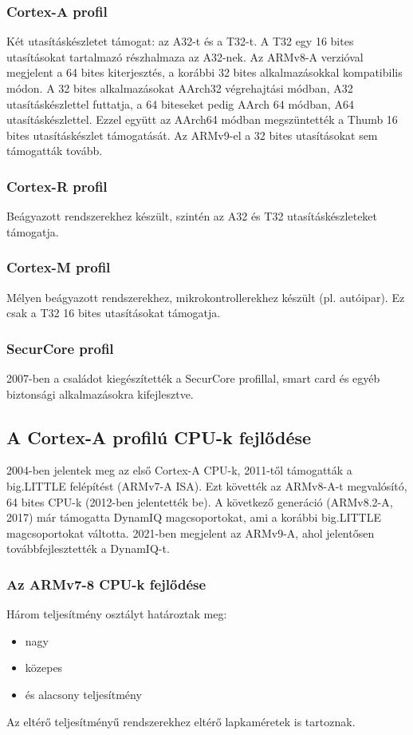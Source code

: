 \subsubsection{Cortex-A profil}
Két utasításkészletet támogat: az A32-t és a T32-t.
A T32 egy 16 bites utasításokat tartalmazó részhalmaza az A32-nek.
Az ARMv8-A verzióval megjelent a 64 bites kiterjesztés, a korábbi 32 bites alkalmazásokkal kompatibilis módon.
A 32 bites alkalmazásokat AArch32 végrehajtási módban, A32 utasításkészlettel futtatja, a 64 biteseket pedig AArch 64 módban, A64 utasításkészlettel.
Ezzel együtt az AArch64 módban megszüntették a Thumb 16 bites utasításkészlet támogatását.
Az ARMv9-el a 32 bites utasításokat sem támogatták tovább.

\subsubsection{Cortex-R profil}
Beágyazott rendszerekhez készült, szintén az A32 és T32 utasításkészleteket támogatja.

\subsubsection{Cortex-M profil}
Mélyen beágyazott rendszerekhez, mikrokontrollerekhez készült (pl. autóipar).
Ez csak a T32 16 bites utasításokat támogatja.

\subsubsection{SecurCore profil}
2007-ben a családot kiegészítették a SecurCore profillal, smart card és egyéb biztonsági alkalmazásokra kifejlesztve.

\subsection{A Cortex-A profilú CPU-k fejlődése}
2004-ben jelentek meg az első Cortex-A CPU-k, 2011-től támogatták a big.LITTLE felépítést (ARMv7-A ISA).
Ezt követték az ARMv8-A-t megvalósító, 64 bites CPU-k (2012-ben jelentették be).
A következő generáció (ARMv8.2-A, 2017) már támogatta DynamIQ magcsoportokat, ami a korábbi big.LITTLE magcsoportokat váltotta.
2021-ben megjelent az ARMv9-A, ahol jelentősen továbbfejlesztették a DynamIQ-t.

\subsubsection{Az ARMv7-8 CPU-k fejlődése}
Három teljesítmény osztályt határoztak meg:
\begin{itemize}
    \item nagy
    \item közepes
    \item és alacsony teljesítmény
\end{itemize}
Az eltérő teljesítményű rendszerekhez eltérő lapkaméretek is tartoznak.

